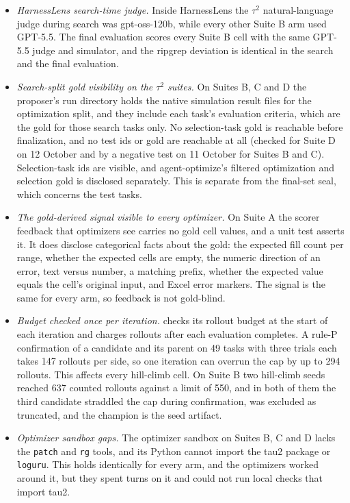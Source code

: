 \begin{itemize}[leftmargin=*,nosep]
\item \emph{HarnessLens search-time judge.} Inside HarnessLens the $\tau^2$ natural-language judge during search was gpt-oss-120b, while every other Suite B arm used GPT-5.5. The final evaluation scores every Suite B cell with the same GPT-5.5 judge and simulator, and the ripgrep deviation is identical in the search and the final evaluation.
\item \emph{Search-split gold visibility on the $\tau^2$ suites.} On Suites B, C and D the \capevolve{} proposer's run directory holds the native simulation result files for the optimization split, and they include each task's evaluation criteria, which are the gold for those search tasks only. No selection-task gold is reachable before finalization, and no test ids or gold are reachable at all (checked for Suite D on 12 October and by a negative test on 11 October for Suites B and C). Selection-task ids are visible, and agent-optimize's filtered optimization and selection gold is disclosed separately. This is separate from the final-set seal, which concerns the test tasks.
\item \emph{The gold-derived signal visible to every optimizer.} On Suite A the scorer feedback that optimizers see carries no gold cell values, and a unit test asserts it. It does disclose categorical facts about the gold: the expected fill count per range, whether the expected cells are empty, the numeric direction of an error, text versus number, a matching prefix, whether the expected value equals the cell's original input, and Excel error markers. The signal is the same for every arm, so feedback is not gold-blind.
\item \emph{Budget checked once per iteration.} \capevolve{} checks its rollout budget at the start of each iteration and charges rollouts after each evaluation completes. A rule-P confirmation of a candidate and its parent on 49 tasks with three trials each takes 147 rollouts per side, so one iteration can overrun the cap by up to 294 rollouts. This affects every hill-climb cell. On Suite B two hill-climb seeds reached 637 counted rollouts against a limit of 550, and in both of them the third candidate straddled the cap during confirmation, was excluded as truncated, and the champion is the seed artifact.
\item \emph{Optimizer sandbox gaps.} The optimizer sandbox on Suites B, C and D lacks the \texttt{patch} and \texttt{rg} tools, and its Python cannot import the tau2 package or \texttt{loguru}. This holds identically for every arm, and the optimizers worked around it, but they spent turns on it and could not run local checks that import tau2.

\end{itemize}
